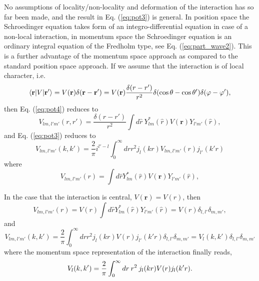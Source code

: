 \documentclass[%
oneside,                 %
final,                   %
10pt]{article}
\begin{document}
No assumptions of locality/non-locality and deformation of the interaction has so far been made, 
and the result in Eq. (\ref{eq:pot3}) is general. In position space the Schroedinger equation 
takes form of an integro-differential equation in case of a non-local interaction, 
in momentum space the Schroedinger equation is an ordinary integral equation of the Fredholm type, 
see Eq. (\ref{eq:part_wave2}). This is a further advantage of the momentum space approach as compared to 
the standard position space approach.  
If we assume that the 
interaction is of local character, i.e. 
\[
  \langle \mathbf{r}\vert V \vert \mathbf{r'}\rangle = V(\mathbf{r}) \delta( \mathbf{r}-\mathbf{r}' ) = 
  V(\mathbf{r}) {\delta( { r}-{r}' ) \over r^2} \delta ( \cos \theta - \cos \theta' ) \delta (\varphi-\varphi'), 
\]
then Eq. (\ref{eq:pot4}) reduces to 
\begin{equation}
  V_{lm, l'm'}(r,r') = \frac{\delta({r}-{r}')}{r^2}\int d{\hat{r}}\:
  Y_{lm}^*(\hat{r})V(\mathbf{r})Y_{l'm'}(\hat{r}),
  \label{eq:pot5}
\end{equation}
and Eq. (\ref{eq:pot3}) reduces to  
\begin{equation}
  V_{lm, l'm'}(k,k') = \frac{2}{\pi}i^{l' -l}\int_0^\infty drr^2j_l(kr) V_{lm,l'm'}(r) j_{l'}(k'r)
  \label{eq:pot6}
\end{equation}
where 
\begin{equation}
  V_{lm, l'm'}(r) = \int d{\hat{r}}Y_{lm}^*(\hat{r})V(\mathbf{r})Y_{l'm'}(\hat{r}),
  \label{eq:pot10}
\end{equation}

In the case that the interaction is central, $V(\mathbf{r}) = V(r)$, then
\begin{equation}
  V_{lm, l'm'}(r) = V(r) \int d{\hat{r}}Y_{lm}^*(\hat{r})Y_{l'm'}(\hat{r}) = V(r) \delta_{l,l'}\delta_{m,m'},
  \label{eq:pot7}
\end{equation}
and 
\begin{equation}
  V_{lm, l'm'}(k,k') = \frac{2}{\pi} \int_0^\infty drr^2j_l(kr) V(r) j_{l'}(k'r)\delta_{l,l'}\delta_{m,m'} = V_l(k,k') \delta_{l,l'}\delta_{m,m'}
  \label{eq:pot8}
\end{equation}
where the momentum space representation of the interaction finally reads,
\begin{equation}
  V_{l}(k,k') = {2 \over \pi} \int_0^\infty dr\: r^2 \:
  j_l(kr) V(r) j_{l}(k'r).
  \label{eq:pot9}
\end{equation}
\end{document}
